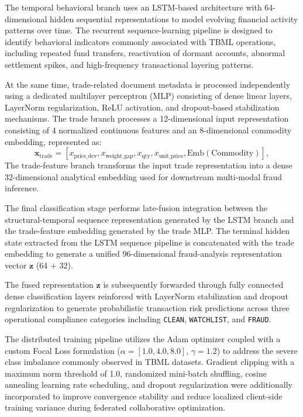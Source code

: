 \documentclass[conference]{IEEEtran}
\begin{document}
The temporal behavioral branch uses an LSTM-based architecture with 64-dimensional hidden sequential representations to model evolving financial activity patterns over time. The recurrent sequence-learning pipeline is designed to identify behavioral indicators commonly associated with TBML operations, including repeated fund transfers, reactivation of dormant accounts, abnormal settlement spikes, and high-frequency transactional layering patterns.

At the same time, trade-related document metadata is processed independently using a dedicated multilayer perceptron (MLP) consisting of dense linear layers, LayerNorm regularization, ReLU activation, and dropout-based stabilization mechanisms. The trade branch processes a 12-dimensional input representation consisting of 4 normalized continuous features and an 8-dimensional commodity embedding, represented as:
\begin{equation}
\mathbf{x}_{\text{trade}} = [x_{\text{price\_dev}}, x_{\text{weight\_gap}}, x_{\text{qty}}, x_{\text{unit\_price}}, \text{Emb}(\text{Commodity})],
\label{eq:trade_features_impl}
\end{equation}
The trade-feature branch transforms the input trade representation into a dense 32-dimensional analytical embedding used for downstream multi-modal fraud inference.

The final classification stage performs late-fusion integration between the structural-temporal sequence representation generated by the LSTM branch and the trade-feature embedding generated by the trade MLP. The terminal hidden state extracted from the LSTM sequence pipeline is concatenated with the trade embedding to generate a unified 96-dimensional fraud-analysis representation vector $\mathbf{z}$ (64 + 32).

The fused representation $\mathbf{z}$ is subsequently forwarded through fully connected dense classification layers reinforced with LayerNorm stabilization and dropout regularization to generate probabilistic transaction risk predictions across three operational compliance categories including \texttt{CLEAN}, \texttt{WATCHLIST}, and \texttt{FRAUD}.

The distributed training pipeline utilizes the Adam optimizer coupled with a custom Focal Loss formulation ($\alpha = [1.0, 4.0, 8.0]$, $\gamma = 1.2$) to address the severe class imbalance commonly observed in TBML datasets. Gradient clipping with a maximum norm threshold of 1.0, randomized mini-batch shuffling, cosine annealing learning rate scheduling, and dropout regularization were additionally incorporated to improve convergence stability and reduce localized client-side training variance during federated collaborative optimization.
\end{document}
